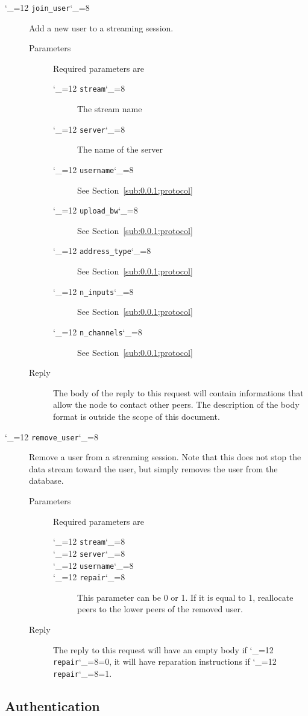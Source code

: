 \documentclass[a4paper,10pt]{medusabook}
\def\ttt{\catcode`\_=12 \tttii}
\def\tttii#1!{{\tt #1}\catcode`\_=8{}}
\begin{document}
\begin{description}
\item[\ttt join\_user!]
Add a new user to a streaming session.  
\begin{description}
\item[Parameters]
Required parameters are
  \begin{description}
    \item[\ttt stream!] The stream name
    \item[\ttt server!] The name of the server
    \item[\ttt username!]  See Section~\ref{sub:0.0.1;protocol}
    \item[\ttt upload\_bw!] See Section~\ref{sub:0.0.1;protocol}
    \item[\ttt address\_type!] See Section~\ref{sub:0.0.1;protocol}
    \item[\ttt n\_inputs!] See Section~\ref{sub:0.0.1;protocol}
    \item[\ttt n\_channels!] See Section~\ref{sub:0.0.1;protocol}
  \end{description}
\item[Reply]
The body of the reply to this request will contain informations that
allow the node to contact other peers.  The description  of the body
format is outside the scope of this document.
\end{description}

\item[\ttt remove\_user!]  
Remove a user from a streaming session.
Note that this does not stop the data stream toward the user, but
simply removes the user from the database. 
\begin{description}
\item[Parameters]
Required parameters are
  \begin{description}
    \item[\ttt stream!] 
    \item[\ttt server!] 
    \item[\ttt username!]  
    \item[\ttt repair!]  This parameter can be 0 or 1. If it is equal
    to 1, reallocate peers to the lower peers of the removed user.
  \end{description}
\item[Reply]
The reply to this request will have an empty body if \ttt repair!=0,
it will have reparation instructions if \ttt repair!=1.
\end{description}
\end{description}
%
\subsection{Authentication}
\label{sub:0.1.0;protocol}
\end{document}
